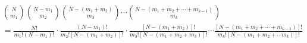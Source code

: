 $$
\begin{aligned}
&{N\choose m_1}{N-m_1\choose m_2}{N-(m_1+m_2)\choose m_3}\cdots{N-(m_1+m_2+\cdots +m_{k-1})\choose m_k}\\
& = \frac{N!}{m_1!(N-m_1)!}\cdot \frac{(N-m_1)!}{m_2![N-(m_1+m_2)]!}\cdot \frac{[N-(m_1+m_2)]!}{m_3![N-(m_1+m_2+m_3)]!}\cdots \frac{[N-(m_1+m_2+\cdots +m_{k-1})]!}{m_k![N - (m_1+m_2+\cdots m_k)]!}
\end{aligned}
$$
